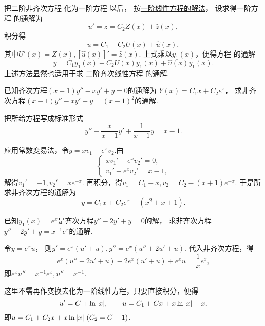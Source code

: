 \begin{enumerate}
	把二阶非齐次方程 
	化为一阶方程  以后，
	按\hyperref[section:微分方程.一阶线性微分方程]{一阶线性方程的解法}，
	设求得一阶方程  的通解为\[
		u' = z = C_2 Z(x) + \hat{z}(x),
	\]
	积分得\[
		u = C_1 + C_2 U(x) + \hat{u}(x),
	\]
	其中\(U'(x) = Z(x), [\hat{u}(x)]' = \hat{z}(x)\).
	上式乘以\(y_1(x)\)，便得方程  的通解
	\begin{equation}\label{equation:微分方程.二阶非齐次线性微分方程的通解.形式2}
		y = C_1 y_1(x) + C_2 U(x) y_1(x) + \hat{u}(x) y_1(x).
	\end{equation}
	上述方法显然也适用于求
	二阶齐次线性方程  的通解.
\end{enumerate}

\begin{example}
已知齐次方程\((x-1)y'' - xy' + y = 0\)的通解为
\(Y(x) = C_1 x + C_2 e^x\)，
求非齐次方程\((x-1)y'' - xy' + y = (x-1)^2\)的通解.
\begin{solution}
把所给方程写成标准形式\[
	y'' - \frac{x}{x-1} y' + \frac{1}{x-1} y = x-1.
\]

应用常数变易法，令\(y = x v_1 + e^x v_2\).由\[
	\left\{ \begin{array}{l}
		x v_1' + e^x v_2' = 0, \\
		v_1' + e^x v_2' = x-1,
	\end{array} \right.
\]
解得\(v_1' = -1, v_2' = x e^{-x}\).
再积分，得\(v_1 = C_1 - x, v_2 = C_2 - (x+1) e^{-x}\).
于是所求非齐次方程的通解为\[
	y = C_1 x + C_2 e^x - (x^2+x+1).
\]
\end{solution}
\end{example}

\begin{example}
已知\(y_1(x) = e^x\)是齐次方程\(y'' - 2y' + y = 0\)的解，
求非齐次方程\(y'' - 2y' + y = x^{-1} e^x\)的通解.
\begin{solution}
令\(y = e^x u\)，
则\(y' = e^x (u'+u), y'' = e^x (u''+2u'+u)\).
代入非齐次方程，得\[
	e^x (u''+2u'+u) - 2e^x (u'+u) + e^x u = \frac{1}{x} e^x,
\]
即\(e^x u'' = x^{-1} e^x, u'' = x^{-1}\).

这里不需再作变换去化为一阶线性方程，只要直接积分，便得\[
	u' = C + \ln\abs{x},
	\qquad
	u = C_1 + C x + x\ln\abs{x} - x,
\]
即\(u = C_1 + C_2 x + x \ln\abs{x}\ (C_2=C-1)\).
\end{solution}
\end{example}

